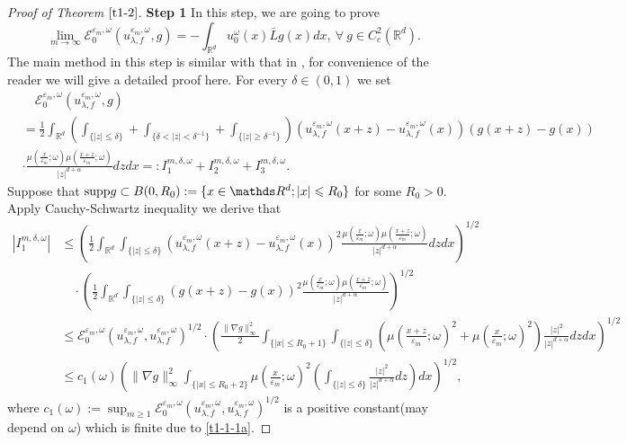 \documentclass[11pt,draft, reqno]{amsart}
\renewcommand{\le}{\leqslant}
\renewcommand{\ge}{\geqslant}
\def\EE{{\mathcal E}}
\newcommand{\R}{\mathds R}
\newcommand{\e}{\varepsilon}
\newcommand{\w}{\omega}
\theoremstyle{definition}
\numberwithin{equation}{section}
\begin{document}
\begin{proof} [Proof of Theorem $\ref{t1-2}$]
{\bf Step 1} In this step, we are going to prove
\begin{equation}\label{t1-2-5}
\lim_{m \to \infty}\EE_0^{\e_m,\w}(u_{\lambda,f}^{\e_m,\w},g)=-\int_{\R^d}u_0^\w(x)\bar L g(x)dx,\ \forall\ g\in C_c^2(\R^d).
\end{equation}
The main method in this step is similar with that in \cite{CCKW1}, for convenience of the reader we will give a detailed proof here.
For every $\delta\in (0,1)$ we set
\begin{equation*}
\begin{split}
&\quad \EE_0^{\e_m,\w}(u_{\lambda,f}^{\e_m,\w},g)\\
&=\frac{1}{2}
\int_{\R^d}\left(\int_{\{|z|\le \delta\}}+\int_{\{\delta<|z|<\delta^{-1}\}}+\int_{\{|z|\ge \delta^{-1}\}}\right)
\left(u_{\lambda,f}^{\e_m,\w}(x+z)-u_{\lambda,f}^{\e_m,\w}(x)\right)\left(g(x+z)-g(x)\right)\\
&\cdot\frac{\mu\left(\frac{x}{\e_m};\w\right)\mu\left(\frac{x+z}{\e_m};\w\right)}{|z|^{d+\alpha}}dzdx
=:I_1^{m,\delta,\w}+I_2^{m,\delta,\w}+I_3^{m,\delta,\w}.
\end{split}
\end{equation*}
Suppose that ${\rm supp}g\subset B(0,R_0):=\{x\in \R^d; |x|\le R_0\}$ for some $R_0>0$. Apply Cauchy-Schwartz inequality
we derive that
\begin{align*}
|I_1^{m,\delta,\w}|&\le \left(\frac{1}{2}\int_{\R^d}\int_{\{|z|\le \delta\}}
\left(u_{\lambda,f}^{\e_m,\w}(x+z)-u_{\lambda,f}^{\e_m,\w}(x)\right)^2\frac{\mu\left(\frac{x}{\e_m};\w\right)\mu\left(\frac{x+z}{\e_m};\w\right)}{|z|^{d+\alpha}}dzdx\right)^{1/2}\\
&\quad \cdot \left(\frac{1}{2}\int_{\R^d}\int_{\{|z|\le \delta\}}
\left(g(x+z)-g(x)\right)^2\frac{\mu\left(\frac{x}{\e_m};\w\right)\mu\left(\frac{x+z}{\e_m};\w\right)}{|z|^{d+\alpha}}\right)^{1/2}\\
&\le \EE_0^{\e_m,\w}\left(u_{\lambda,f}^{\e_m,\w},u_{\lambda,f}^{\e_m,\w}\right)^{1/2}\cdot
\left(\frac{\|\nabla g\|_\infty^2}{2}\int_{\{|x|\le R_0+1\}}\int_{\{|z|\le \delta\}}
\left(\mu\left(\frac{x+z}{\e_m};\w\right)^2+\mu\left(\frac{x}{\e_m};\w\right)^2\right)\frac{|z|^2}{|z|^{d+\alpha}}dzdx\right)^{1/2}\\
&\le c_1(\w)
\left(\|\nabla g\|_\infty^2\int_{\{|x|\le R_0+2\}}\mu\left(\frac{x}{\e_m};\w\right)^2\left(\int_{\{|z|\le \delta\}}
\frac{|z|^2}{|z|^{d+\alpha}}dz\right)dx\right)^{1/2},
\end{align*}
where $c_1(\w):=\sup_{m\ge 1}\EE_0^{\e_m,\w}\left(u_{\lambda,f}^{\e_m,\w},u_{\lambda,f}^{\e_m,\w}\right)^{1/2}$
is a positive constant(may depend on $\w$) which is finite due to \eqref{t1-1-1a}.


\end{proof}
\end{document}
